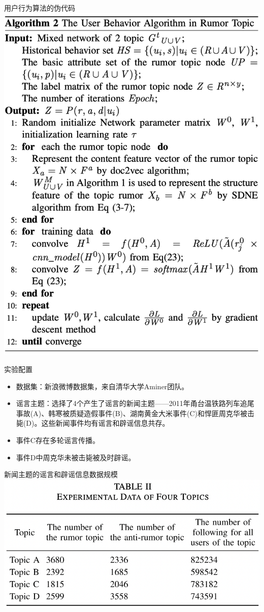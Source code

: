 \documentclass{beamer}
\begin{document}
\begin{frame}{用户行为算法的伪代码}
	\includegraphics[width=0.6\linewidth]{Assets/算法2.png}
\end{frame}

\begin{frame}{实验配置}
	\begin{itemize}
		\item 数据集：新浪微博数据集，来自清华大学Aminer团队。
		\item 谣言主题：选择了4个产生了谣言的新闻主题——2011年甬台温铁路列车追尾事故(A)、韩寒被质疑造假事件(B)、湖南黄金大米事件(C)和悍匪周克华被击毙(D)。这些新闻事件均有谣言和辟谣信息共存。
		\item 事件C存在多轮谣言传播。
		\item 事件D中周克华未被击毙被及时辟谣。
	\end{itemize}
\end{frame}

\begin{frame}{新闻主题的谣言和辟谣信息数据规模}
	\includegraphics[width=\linewidth]{Assets/表2.png}
\end{frame}
\end{document}
